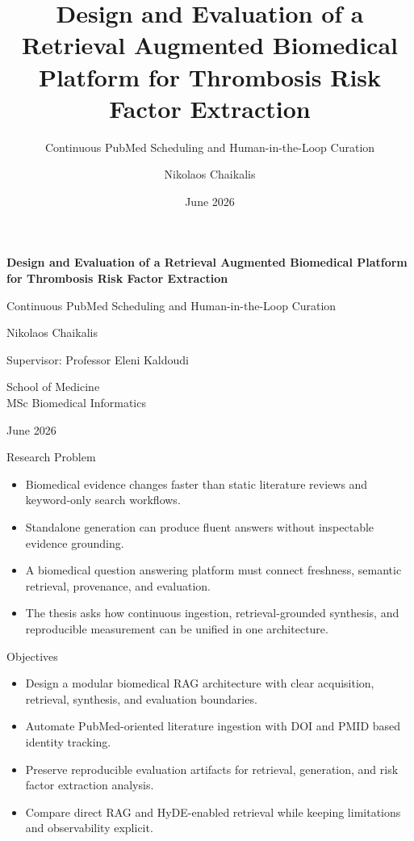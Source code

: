 \documentclass[aspectratio=169,11pt]{beamer}
\title[Biomedical RAG Thesis]{Design and Evaluation of a Retrieval Augmented Biomedical Platform for Thrombosis Risk Factor Extraction}
\subtitle{Continuous PubMed Scheduling and Human-in-the-Loop Curation}
\author[N. Chaikalis]{Nikolaos Chaikalis}
\institute[DUTH]{School of Medicine, MSc Biomedical Informatics}
\date{June 2026}
\begin{document}
\begin{frame}
\centering
\vspace{0.35cm}
{\Large\bfseries\color{AcademicBlue}
Design and Evaluation of a Retrieval Augmented Biomedical Platform\\
for Thrombosis Risk Factor Extraction\par}

\vspace{0.35cm}
{\large\color{AcademicGray} Continuous PubMed Scheduling and Human-in-the-Loop Curation\par}

\vspace{0.85cm}
{\normalsize Nikolaos Chaikalis\par}
{\small Supervisor: Professor Eleni Kaldoudi\par}

\vspace{0.5cm}
{\small School of Medicine\\MSc Biomedical Informatics\par}

\vfill
{\small June 2026\par}
\end{frame}

\begin{frame}{Research Problem}
\begin{itemize}
  \item Biomedical evidence changes faster than static literature reviews and keyword-only search workflows.
  \item Standalone generation can produce fluent answers without inspectable evidence grounding.
  \item A biomedical question answering platform must connect freshness, semantic retrieval, provenance, and evaluation.
  \item The thesis asks how continuous ingestion, retrieval-grounded synthesis, and reproducible measurement can be unified in one architecture.
\end{itemize}
\end{frame}

\begin{frame}{Objectives}
\begin{itemize}
  \item Design a modular biomedical RAG architecture with clear acquisition, retrieval, synthesis, and evaluation boundaries.
  \item Automate PubMed-oriented literature ingestion with DOI and PMID based identity tracking.
  \item Preserve reproducible evaluation artifacts for retrieval, generation, and risk factor extraction analysis.
  \item Compare direct RAG and HyDE-enabled retrieval while keeping limitations and observability explicit.
\end{itemize}
\end{frame}
\end{document}
